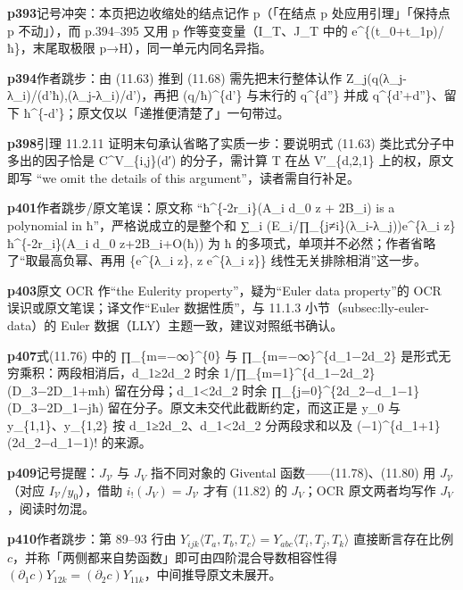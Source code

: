 \noindent\textbf{\footnotesize p393}\quad 记号冲突：本页把边收缩处的结点记作 p（「在结点 p 处应用引理」「保持点 p 不动」），而 p.394–395 又用 p 作等变变量（I\_T、J\_T 中的 e\^{}\{(t\_0+t\_1p)/ħ\}，末尾取极限 p→H），同一单元内同名异指。

\noindent\textbf{\footnotesize p394}\quad 作者跳步：由 (11.63) 推到 (11.68) 需先把末行整体认作 Z\_j(q(λ\_j-λ\_i)/(d'ħ),(λ\_j-λ\_i)/d')，再把 (q/ħ)\^{}\{d'\} 与末行的 q\^{}\{d''\} 并成 q\^{}\{d'+d''\}、留下 ħ\^{}\{-d'\}；原文仅以「递推便清楚了」一句带过。

\noindent\textbf{\footnotesize p398}\quad 引理 11.2.11 证明末句承认省略了实质一步：要说明式 (11.63) 类比式分子中多出的因子恰是 C\^{}V\_\{i,j\}(d′) 的分子，需计算 T 在丛 V′\_\{d,2,1\} 上的权，原文即写 “we omit the details of this argument”，读者需自行补足。

\noindent\textbf{\footnotesize p401}\quad 作者跳步/原文笔误：原文称 “ħ\^{}\{-2r\_i\}(A\_i d\_0 z + 2B\_i) is a polynomial in ħ”，严格说成立的是整个和 ∑\_i (E\_i/∏\_\{j≠i\}(λ\_i-λ\_j))e\^{}\{λ\_i z\}ħ\^{}\{-2r\_i\}(A\_i d\_0 z+2B\_i+O(ħ)) 为 ħ 的多项式，单项并不必然；作者省略了“取最高负幂、再用 \{e\^{}\{λ\_i z\}, z e\^{}\{λ\_i z\}\} 线性无关排除相消”这一步。

\noindent\textbf{\footnotesize p403}\quad 原文 OCR 作“the Eulerity property”，疑为“Euler data property”的 OCR 误识或原文笔误；译文作“Euler 数据性质”，与 11.1.3 小节（subsec:lly-euler-data）的 Euler 数据（LLY）主题一致，建议对照纸书确认。

\noindent\textbf{\footnotesize p407}\quad 式(11.76) 中的 ∏\_\{m=−∞\}\^{}\{0\} 与 ∏\_\{m=−∞\}\^{}\{d\_1−2d\_2\} 是形式无穷乘积：两段相消后，d\_1≥2d\_2 时余 1/∏\_\{m=1\}\^{}\{d\_1−2d\_2\}(D\_3−2D\_1+mħ) 留在分母；d\_1<2d\_2 时余 ∏\_\{j=0\}\^{}\{2d\_2−d\_1−1\}(D\_3−2D\_1−jħ) 留在分子。原文未交代此截断约定，而这正是 y\_0 与 y\_\{1,1\}、y\_\{1,2\} 按 d\_1≥2d\_2、d\_1<2d\_2 分两段求和以及 (−1)\^{}\{d\_1+1\}(2d\_2−d\_1−1)! 的来源。

\noindent\textbf{\footnotesize p409}\quad 记号提醒：$J_{\mathcal V}$ 与 $J_V$ 指不同对象的 Givental 函数——(11.78)、(11.80) 用 $J_{\mathcal V}$（对应 $I_{\mathcal V}/y_0$），借助 $i_!(J_V)=J_{\mathcal V}$ 才有 (11.82) 的 $J_V$；OCR 原文两者均写作 $J_V$，阅读时勿混。

\noindent\textbf{\footnotesize p410}\quad 作者跳步：第 89–93 行由 $Y_{ijk}\langle T_a,T_b,T_c\rangle=Y_{abc}\langle T_i,T_j,T_k\rangle$ 直接断言存在比例 $c$，并称「两侧都来自势函数」即可由四阶混合导数相容性得 $(\partial_1c)Y_{12k}=(\partial_2c)Y_{11k}$，中间推导原文未展开。

